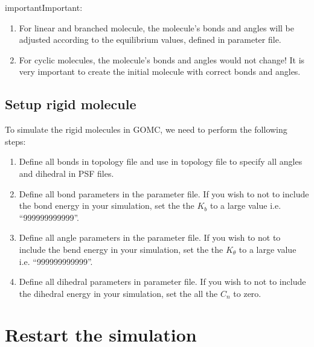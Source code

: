 \documentclass[letterpaper,10pt,english]{sphinxmanual}
\begin{document}
\begin{sphinxadmonition}{important}{Important:}\begin{enumerate}
%
\item {} 
For linear and branched molecule, the molecule’s bonds and angles  will be adjusted according to the equilibrium values, defined in parameter file.

\item {} 
For cyclic molecules, the molecule’s bonds and angles would not change! It is very important to create the initial molecule with correct bonds and angles.

\end{enumerate}
\end{sphinxadmonition}


\subsection{Setup rigid  molecule}
\label{\detokenize{howto:setup-rigid-molecule}}
To simulate the rigid molecules in GOMC, we need to perform the following steps:
\begin{enumerate}
%
\item {} 
Define all bonds in topology file and use  in topology file to specify all angles and dihedral in PSF files.

\item {} 
Define all bond parameters in the parameter file. If you wish to not to include the bond energy in your simulation, set the
the \(K_b\) to a large value i.e. “999999999999”.

\item {} 
Define all angle parameters in the parameter file. If you wish to not to include the bend energy in your simulation, set the
the \(K_{\theta}\) to a large value i.e. “999999999999”.

\item {} 
Define all dihedral parameters in parameter file. If you wish to not to include the dihedral energy in your simulation, set the all
the \(C_n\) to zero. 

\end{enumerate}


\section{Restart the simulation}
\label{\detokenize{howto:restart-the-simulation}}
\end{document}
